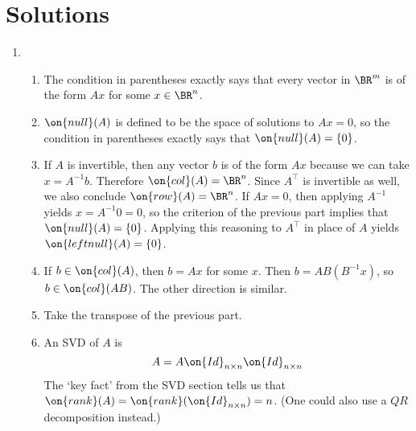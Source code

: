 \documentclass[10pt]{amsart}
\theoremstyle{mythm}
\theoremstyle{definition}
\theoremstyle{myrmk}
\begin{document}
	\section{Solutions} 
	\begin{enumerate}[label=\arabic*.]
		\item \begin{enumerate}[label=(\arabic*)]
			\item The condition in parentheses exactly says that every vector in $\BR^m$ is of the form $Ax$ for some $x \in \BR^n$. 
			\item $\on{null}(A)$ is defined to be the space of solutions to $Ax = 0$, so the condition in parentheses exactly says that $\on{null}(A) = \{0\}$. 
			\item If $A$ is invertible, then any vector $b$ is of the form $Ax$ because we can take $x = A^{-1}b$. Therefore $\on{col}(A) = \BR^n$. Since $A^\top$ is invertible as well, we also conclude $\on{row}(A) = \BR^n$. If $Ax = 0$, then applying $A^{-1}$ yields $x = A^{-1}0 = 0$, so the criterion of the previous part implies that $\on{null}(A) = \{0\}$. Applying this reasoning to $A^\top$ in place of $A$ yields $\on{leftnull}(A) = \{0\}$. 
			\item If $b \in \on{col}(A)$, then $b = Ax$ for some $x$. Then $b = AB(B^{-1}x)$, so $b \in \on{col}(AB)$. The other direction is similar. 
			\item Take the transpose of the previous part. 
			\item An SVD of $A$ is 
			\[
				A = A \on{Id}_{n \times n} \on{Id}_{n \times n}
			\]
			The `key fact' from the SVD section tells us that $\on{rank}(A) = \on{rank}(\on{Id}_{n \times n}) = n$. (One could also use a $QR$ decomposition instead.) 
			

\end{enumerate}
\end{enumerate}
\end{document}
